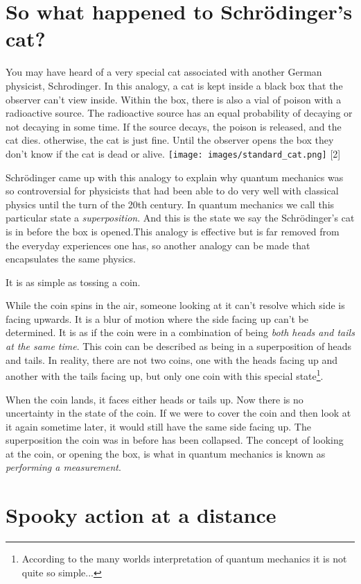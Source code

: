 \documentclass{book}
\begin{document}
\section{So what happened to Schrödinger’s cat?}

You may have heard of a very special cat associated with another German physicist, Schrodinger. In this analogy, a cat is kept inside a black box that the observer can't view inside. Within the box, there is also a vial of poison with a radioactive source. The radioactive source has an equal probability of decaying or not decaying in some time. If the source decays, the poison is released, and the cat dies. otherwise, the cat is just fine. Until the observer opens the box they don't know if the cat is dead or alive. 
\texttt{[image: images/standard\_cat.png]}
[2]

Schrödinger came up with this analogy to explain why quantum mechanics was so controversial for physicists that had been able to do very well with classical physics until the turn of the 20th century. In quantum mechanics we call this particular state a \textit{superposition}. And this is the state we say the Schrödinger's cat is in before the box is opened.This analogy is effective but is far removed from the everyday experiences one has, so another analogy can be made that encapsulates the same physics. 

It is as simple as tossing a coin.  

While the coin spins in the air, someone looking at it can't resolve which side is facing upwards. It is a blur of motion where the side facing up can't be determined. It is as if the coin were in a combination of being \textit{both heads and tails at the same time}.  This coin can be described as being in a superposition of heads and tails. In reality, there are not two coins, one with the heads facing up and another with the tails facing up, but only one coin with this special state\footnote{According to the many worlds interpretation of quantum mechanics it is not quite so simple...}.

When the coin lands, it faces either heads or tails up. Now there is no uncertainty in the state of the coin. If we were to cover the coin and then look at it again sometime later, it would still have the same side facing up. The superposition the coin was in before has been collapsed. The concept of looking at the coin, or opening the box, is what in quantum mechanics is known as \textit{performing a measurement}.


\section{Spooky action at a distance}
\end{document}
